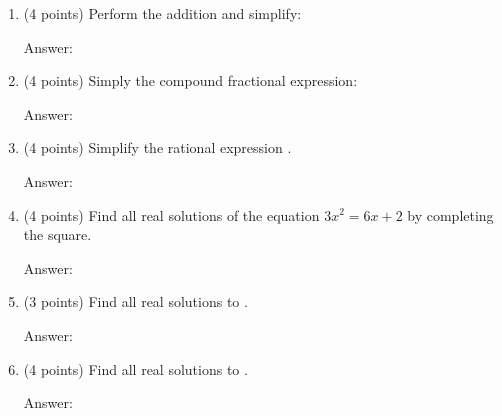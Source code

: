 \documentclass[11pt]{article}
\begin{document}
\begin{enumerate}

\item (4 points) Perform the addition and simplify: 
\begin{flushright}{Answer: \underline{\hspace{2in}}}\end{flushright}

\vspace{1in}

\item (4 points) Simply the compound fractional expression: 
\begin{flushright}{Answer: \underline{\hspace{2in}}}\end{flushright}

\vspace{1in}

\item (4 points) Simplify the rational expression .\\
\begin{flushright}{Answer: \underline{\hspace{2in}}}\end{flushright}

\vspace{1in}

\item  (4 points)  Find all real solutions of the equation $ 3x^2=6x+2$ by completing the square.
\begin{flushright}{Answer: \underline{\hspace{2in}}}\end{flushright}

\vfill

\newpage
\item (3 points) Find all real solutions to \scalebox{1.4}{$\vert 4x-7\vert=11$}.
\begin{flushright}{Answer: \underline{\hspace{2in}}}\end{flushright}

\vfill
\item (4 points) Find all real solutions to .
\begin{flushright}{Answer: \underline{\hspace{2in}}}\end{flushright}


\end{enumerate}
\end{document}
